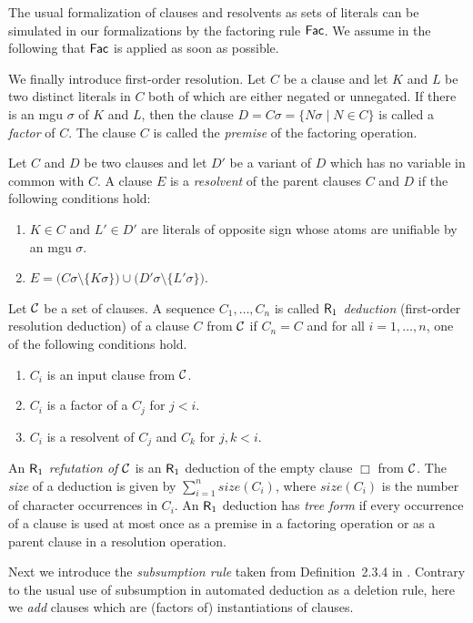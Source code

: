 \documentclass{llncs}
\newcommand{\emptyclause}{\Box}
\newcommand{\Rfo}{$\mbox{\sf R}_1$}
\newcommand{\Fac}{$\mbox{\sf Fac}$}
\newcommand{\caC}{{\cal C}}
\newcommand{\size}[1]{\mathit{size}(#1)}
\begin{document}
\begin{remark}\label{rem:clauses-as-sets}
The usual formalization of clauses and resolvents as sets of literals
can be simulated in our formalizations by the factoring rule
\Fac. We assume in the following that \Fac{} is applied
as soon as possible.
\end{remark}


We finally introduce first-order resolution.  Let $C$ be a clause and
let $K$ and $L$ be two distinct literals in $C$ both of which are
either negated or unnegated.  If there is an mgu $\sigma$ of $K$ and
$L$, then the clause $D=C\sigma=\{N\sigma \mid N\in C\}$ is called a
\emph{factor} of $C$. The clause $C$ is called the \emph{premise} of the
factoring operation.

Let $C$ and $D$ be two clauses and let $D'$ be a variant of $D$ which
has no variable in common with $C$. A clause $E$ is a \emph{resolvent}
of the parent clauses $C$ and $D$ if the following conditions hold:
\begin{enumerate}
\item $K\in C$ and $L'\in D'$ are literals of opposite sign whose
  atoms are unifiable by an mgu $\sigma$.

\item $E=\big(C\sigma \setminus \{K\sigma\}\big) \cup 
\big(D'\sigma \setminus \{L'\sigma\}\big)$.
\end{enumerate}
Let $\caC$ be a set of clauses. A sequence $C_1, \ldots , C_n$ is
called \emph{\Rfo{} deduction} (first-order resolution deduction) of a
clause $C$ from $\caC$ if $C_n = C$ and for all $i = 1, \ldots , n$,
one of the following conditions hold.
\begin{enumerate}
  \item $C_i$ is an input clause from $\caC$.
  \item $C_i$ is a factor of a $C_j$ for $j < i$.
  \item $C_i$ is a resolvent of $C_j$ and $C_k$ for $j,k < i$.
\end{enumerate}
An \emph{\Rfo{} refutation of $\caC$} is an \Rfo{} deduction of the
empty clause $\emptyclause$ from $\caC$.  The \emph{size} of a
deduction is given by $\sum_{i=1}^n \size{C_i}$, where $\size{C_i}$ is
the number of character occurrences in $C_i$. An \Rfo{} deduction has
\emph{tree form} if every occurrence of a clause is used at most once
as a premise in a factoring operation or as a parent clause in a
resolution operation.

Next we introduce the \emph{subsumption rule} taken from
Definition~2.3.4 in \cite{Eder:1992}. Contrary to the usual use of
subsumption in automated deduction as a deletion rule, here we
\emph{add} clauses which are (factors of) instantiations of clauses.
\end{document}
